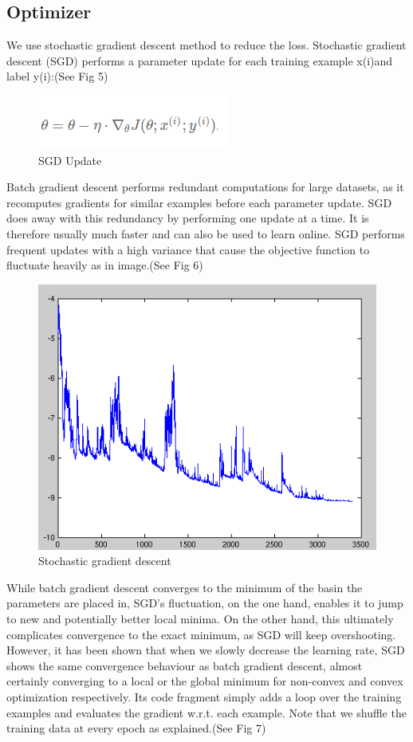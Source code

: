 \documentclass[12pt]{report}
\begin{document}
\subsection*{Optimizer}
We use stochastic gradient descent method to reduce the loss. Stochastic gradient descent (SGD) performs a parameter update for each training example x(i)and label y(i):(See Fig 5)

\begin{figure}[h]
    \centering
    \includegraphics{eqn1.png}
    \caption{SGD Update}
\end{figure}

Batch gradient descent performs redundant computations for large datasets, as it recomputes gradients for similar examples before each parameter update. SGD does away with this redundancy by performing one update at a time. It is therefore usually much faster and can also be used to learn online. 
SGD performs frequent updates with a high variance that cause the objective function to fluctuate heavily as in image.(See Fig 6)

\begin{figure}[h]
    \centering
    \includegraphics[scale=.5]{fig5.png}
    \caption{Stochastic gradient descent}
\end{figure}

While batch gradient descent converges to the minimum of the basin the parameters are placed in, SGD's fluctuation, on the one hand, enables it to jump to new and potentially better local minima. On the other hand, this ultimately complicates convergence to the exact minimum, as SGD will keep overshooting. However, it has been shown that when we slowly decrease the learning rate, SGD shows the same convergence behaviour as batch gradient descent, almost certainly converging to a local or the global minimum for non-convex and convex optimization respectively. 
Its code fragment simply adds a loop over the training examples and evaluates the gradient w.r.t. each example. Note that we shuffle the training data at every epoch as explained.(See Fig 7)
\end{document}
